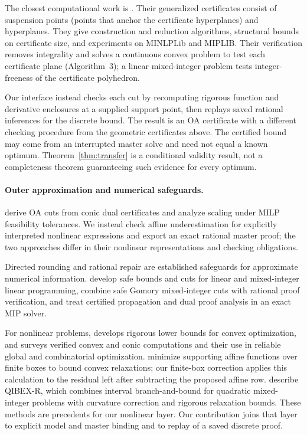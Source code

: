 The closest computational work is \citet{halbig2024-computing-optimality-certificates-for-convex}. Their generalized certificates consist of suspension points (points that anchor the certificate hyperplanes) and hyperplanes. They give construction and reduction algorithms, structural bounds on certificate size, and experiments on MINLPLib and MIPLIB. Their verification removes integrality and solves a continuous convex problem to test each certificate plane (Algorithm~3); a linear mixed-integer problem tests integer-freeness of the certificate polyhedron.

Our interface instead checks each cut by recomputing rigorous function and derivative enclosures at a supplied support point, then replays saved rational inferences for the discrete bound. The result is an OA certificate with a different checking procedure from the geometric certificates above. The certified bound may come from an interrupted master solve and need not equal a known optimum. Theorem~\ref{thm:transfer} is a conditional validity result, not a completeness theorem guaranteeing such evidence for every optimum.

\paragraph{Outer approximation and numerical safeguards.}
\citet{coey2020-outer-approximation-with-conic-certificates} derive OA cuts from conic dual certificates and analyze scaling under MILP feasibility tolerances. We instead check affine underestimation for explicitly interpreted nonlinear expressions and export an exact rational master proof; the two approaches differ in their nonlinear representations and checking obligations.

Directed rounding and rational repair are established safeguards for approximate numerical information. \citet{neumaier2004-safe-bounds-in-linear-and} develop safe bounds and cuts for linear and mixed-integer linear programming, \citet{eifler2024-safe-and-verified-gomory-mixed} combine safe Gomory mixed-integer cuts with rational proof verification, and \citet{borst2024-certified-constraint-propagation-and-dual} treat certified propagation and dual proof analysis in an exact MIP solver.

For nonlinear problems, \citet{jansson2004-rigorous-convex} develops rigorous lower bounds for convex optimization, and \citet{jansson2009-verified-convex} surveys verified convex and conic computations and their use in reliable global and combinatorial optimization. \citet{messine2019-reliable-relaxation} minimize supporting affine functions over finite boxes to bound convex relaxations; our finite-box correction applies this calculation to the residual left after subtracting the proposed affine row. \citet{elloumi2025-qibex} describe QIBEX-R, which combines interval branch-and-bound for quadratic mixed-integer problems with curvature correction and rigorous relaxation bounds. These methods are precedents for our nonlinear layer. Our contribution joins that layer to explicit model and master binding and to replay of a saved discrete proof.

